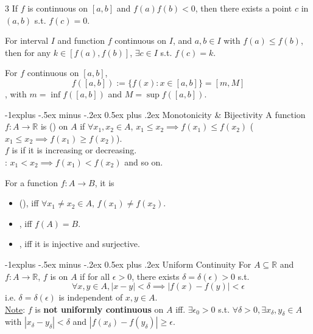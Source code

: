 \documentclass[10pt,landscape,letterpaper]{article}
\makeatletter
\renewcommand{\subsection}{\@startsection{subsection}{2}{0mm}%
                                {-1explus -.5ex minus -.2ex}%
                                {0.5ex plus .2ex}%
                                {\sffamily\normalsize\itshape}}
\makeatother
\begin{document}
\begin{multicols}{3}
 If $f$ is continuous on $[a, b]$ and $f(a)f(b) < 0$, then there exists a point $c$ in $(a, b)$ s.t. $f(c) = 0$.




 For interval $I$ and function $f$ continuous on $I$, and $a, b \in I$ with $f(a) \le f(b)$,  then for any $k \in [f(a), f(b)]$, $\exists c \in I$ s.t. $f(c) = k$.




 For $f$ continuous on $[a, b]$,
\[
f([a, b]) := \{ f(x): x \in [a, b] \} = [m, M]
\]
, with $m = \inf f([a, b])$ and $M = \sup f([a, b])$.





\subsection{Monotonicity \& Bijectivity}
A function $f: A \to \mathbb{R}$ is  () on $A$ if $\forall x_1, x_2 \in A$, $x_1 \le x_2 \implies f(x_1) \le f(x_2)$ ($x_1 \le x_2 \implies f(x_1) \ge f(x_2)$).
\\
$f$ is  if it is increasing or decreasing.
\\
: $x_1 < x_2 \implies f(x_1) < f(x_2)$ and so on.


\smallbreak


For a function $f: A \to B$, it is
\begin{itemize}
    \item {} (), iff $\forall x_1 \neq x_2 \in A$, $f(x_1) \neq f(x_2)$.
    \item {}, iff $f(A) = B$.
    \item {}, iff it is injective and surjective.
\end{itemize}





\subsection{Uniform Continuity}
For $A \subseteq \mathbb{R}$ and $f: A \to \mathbb{R}$, $f$ is  on $A$ if for all  $\epsilon > 0$, there exists $\delta = \delta(\epsilon) > 0$ s.t.
\[
\forall x, y \in A, |x-y| < \delta \implies |f(x) - f(y)| < \epsilon
\]
i.e. $\delta = \delta(\epsilon)$ is independent of $x, y \in A$.
\\
\underline{Note}: $f$ is \textbf{not uniformly continuous} on $A$ iff. $\exists \epsilon_0 > 0$ s.t. $\forall \delta > 0, \exists x_\delta, y_\delta \in A$ with $|x_\delta - y_\delta| < \delta$ and $|f(x_\delta) - f(y_\delta)| \ge \epsilon$.


\end{multicols}
\end{document}
